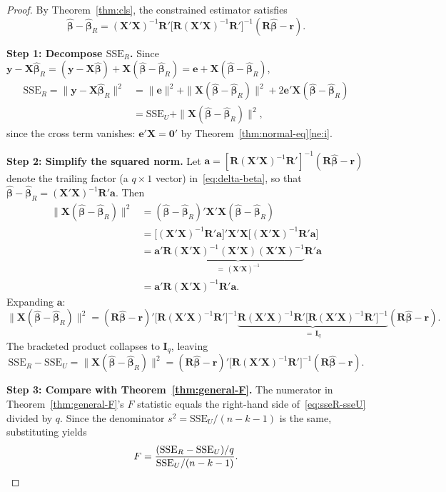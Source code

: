 \documentclass[14pt]{extarticle}
\theoremstyle{plain}
\theoremstyle{definition}
\theoremstyle{remark}
\newcommand{\SSE}{\mathrm{SSE}}
\newcommand{\bX}{\mathbf{X}}
\newcommand{\by}{\mathbf{y}}
\def\bb{\boldsymbol{\beta}}
\newcommand{\bI}{\mathbf{I}}
\newcommand{\bR}{\mathbf{R}}
\newcommand{\br}{\mathbf{r}}
\newcommand{\bzero}{\mathbf{0}}
\newcommand{\ba}{\mathbf{a}}
\begin{document}
\begin{proof}
By Theorem~\ref{thm:cls}, the constrained estimator satisfies
\begin{equation}\label{eq:delta-beta}
\hat{\bb} - \hat{\bb}_R = (\bX'\bX)^{-1}\bR'\bigl[\bR(\bX'\bX)^{-1}\bR'\bigr]^{-1}(\bR\hat{\bb} - \br).
\end{equation}

\textbf{Step 1: Decompose $\SSE_R$.} Since $\by - \bX\hat{\bb}_R = (\by - \bX\hat{\bb}) + \bX(\hat{\bb} - \hat{\bb}_R) = \mathbf{e} + \bX(\hat{\bb} - \hat{\bb}_R)$,
\begin{align*}
\SSE_R = \|\by - \bX\hat{\bb}_R\|^2 &= \|\mathbf{e}\|^2 + \|\bX(\hat{\bb} - \hat{\bb}_R)\|^2 + 2\mathbf{e}'\bX(\hat{\bb} - \hat{\bb}_R)\\
&= \SSE_U + \|\bX(\hat{\bb} - \hat{\bb}_R)\|^2,
\end{align*}
since the cross term vanishes: $\mathbf{e}'\bX = \bzero'$ by Theorem~\ref{thm:normal-eq}\ref{ne:i}.

\textbf{Step 2: Simplify the squared norm.} Let $\ba = [\bR(\bX'\bX)^{-1}\bR']^{-1}(\bR\hat{\bb} - \br)$ denote the trailing factor (a $q \times 1$ vector) in~\eqref{eq:delta-beta}, so that $\hat{\bb} - \hat{\bb}_R = (\bX'\bX)^{-1}\bR'\ba$. Then
\begin{align*}
\|\bX(\hat{\bb} - \hat{\bb}_R)\|^2 &= (\hat{\bb} - \hat{\bb}_R)'\bX'\bX(\hat{\bb} - \hat{\bb}_R)\\
&= \bigl[(\bX'\bX)^{-1}\bR'\ba\bigr]'\bX'\bX\bigl[(\bX'\bX)^{-1}\bR'\ba\bigr]\\
&= \ba'\bR\underbrace{(\bX'\bX)^{-1}(\bX'\bX)(\bX'\bX)^{-1}}_{=\,(\bX'\bX)^{-1}}\bR'\ba\\
&= \ba'\bR(\bX'\bX)^{-1}\bR'\ba.
\end{align*}
Expanding $\ba$:
\[
\|\bX(\hat{\bb} - \hat{\bb}_R)\|^2 = (\bR\hat{\bb} - \br)'\bigl[\bR(\bX'\bX)^{-1}\bR'\bigr]^{-1}\underbrace{\bR(\bX'\bX)^{-1}\bR'\bigl[\bR(\bX'\bX)^{-1}\bR'\bigr]^{-1}}_{=\,\bI_q}(\bR\hat{\bb} - \br).
\]
The bracketed product collapses to $\bI_q$, leaving
\begin{equation}\label{eq:sseR-sseU}
\SSE_R - \SSE_U = \|\bX(\hat{\bb} - \hat{\bb}_R)\|^2 = (\bR\hat{\bb} - \br)'\bigl[\bR(\bX'\bX)^{-1}\bR'\bigr]^{-1}(\bR\hat{\bb} - \br).
\end{equation}

\textbf{Step 3: Compare with Theorem~\ref{thm:general-F}.} The numerator in Theorem~\ref{thm:general-F}'s $F$ statistic equals the right-hand side of~\eqref{eq:sseR-sseU} divided by $q$. Since the denominator $s^2 = \SSE_U/(n-k-1)$ is the same, substituting yields
\[
F = \frac{(\SSE_R - \SSE_U)/q}{\SSE_U/(n-k-1)}. \qedhere
\]
\end{proof}
\end{document}
